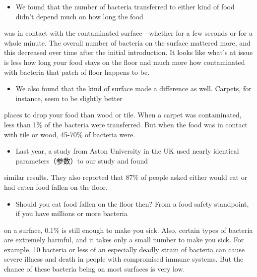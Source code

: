 \documentclass[UTF8,11pt]{ctexart}
\begin{document}
\begin{itemize}[leftmargin=2em,itemsep=.2em,topsep=.4em]\item[H.] We found that the number of bacteria transferred to either kind of food didn’t depend much on how long the food
\end{itemize}

was in contact with the contaminated surface—whether for a few seconds or for a whole minute. The overall number of bacteria on the surface mattered more, and this decreased over time after the initial introduction. It looks like what’s at issue is less how long your food stays on the floor and much more how contaminated with bacteria that patch of floor happens to be.


\begin{itemize}[leftmargin=2em,itemsep=.2em,topsep=.4em]\item[I.] We also found that the kind of surface made a difference as well. Carpets, for instance, seem to be slightly better
\end{itemize}

places to drop your food than wood or tile. When a carpet was contaminated, less than 1\% of the bacteria were transferred. But when the food was in contact with tile or wood, 45-70\% of bacteria were.


\begin{itemize}[leftmargin=2em,itemsep=.2em,topsep=.4em]\item[J.] Last year, a study from Aston University in the UK used nearly identical parameters（参数）to our study and found
\end{itemize}

similar results. They also reported that 87\% of people asked either would eat or had eaten food fallen on the floor.


\begin{itemize}[leftmargin=2em,itemsep=.2em,topsep=.4em]\item[K.] Should you eat food fallen on the floor then? From a food safety standpoint, if you have millions or more bacteria
\end{itemize}

on a surface, 0.1\% is still enough to make you sick. Also, certain types of bacteria are extremely harmful, and it takes only a small number to make you sick. For example, 10 bacteria or less of an especially deadly strain of bacteria can cause severe illness and death in people with compromised immune systems. But the chance of these bacteria being on most surfaces is very low.
\end{document}
